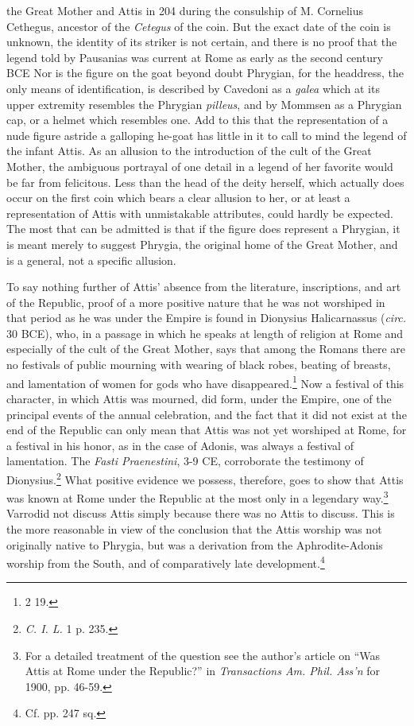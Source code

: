 \documentclass[a4paper, 11pt, oneside, polutonikogreek, french]{article}
\begin{document}
the Great Mother and Attis in 204 during the consulship of M. Cornelius Cethegus, ancestor of the \emph{Cetegus} of the coin. But the exact date of the coin is unknown, the identity of its striker is not certain, and there is no proof that the legend told by Pausanias was current at Rome as early as the second century \textsc{BCE} Nor is the figure on the goat beyond doubt Phrygian, for the headdress, the only means of identification, is described by Cavedoni as a \emph{galea} which at its upper extremity resembles the Phrygian \emph{pilleus}, and by Mommsen as a Phrygian cap, or a helmet which resembles one. Add to this that the representation of a nude figure astride a galloping he-goat has little in it to call to mind the legend of the infant Attis. As an allusion to the introduction of the cult of the Great Mother, the ambiguous portrayal of one detail in a legend of her favorite would be far from felicitous. Less than the head of the deity herself, which actually does occur on the first coin which bears a clear allusion to her, or at least a representation of Attis with unmistakable attributes, could hardly be expected. The most that can be admitted is that if the figure does represent a Phrygian, it is meant merely to suggest Phrygia, the original home of the Great Mother, and is a general, not a specific allusion.

To say nothing further of Attis' absence from the literature, inscriptions, and art of the Republic, proof of a more positive nature that he was not worshiped in that period as he was under the Empire is found in Dionysius Halicarnassus (\emph{circ.} 30 \textsc{BCE}), who, in a passage in which he speaks at length of religion at Rome and especially of the cult of the Great Mother, says that among the Romans there are no festivals of public mourning with wearing of black robes, beating of breasts, and lamentation of women for gods who have disappeared.\footnote{2 19.} Now a festival of this character, in which Attis was mourned, did form, under the Empire, one of the principal events of the annual celebration, and the fact that it did not exist at the end of the Republic can only mean that Attis was not yet worshiped at Rome, for a festival in his honor, as in the case of Adonis, was always a festival of lamentation. The \emph{Fasti Praenestini}, 3-9 \textsc{CE}, corroborate the testimony of Dionysius.\footnote{\emph{C. I. L.} 1 p. 235.} What positive evidence we possess, therefore, goes to show that Attis was known at Rome under the Republic at the most only in a legendary way.\footnote{For a detailed treatment of the question see the author's article on ``Was Attis at Rome under the Republic?'' in \emph{Transactions Am. Phil. Ass'n} for 1900, pp. 46-59.} Varrodid not discuss Attis simply because there was no Attis to discuss. This is the more reasonable in view of the conclusion that the Attis worship was not originally native to Phrygia, but was a derivation from the Aphrodite-Adonis worship from the South, and of comparatively late development.\footnote{Cf. pp. 247 sq.}
\end{document}
